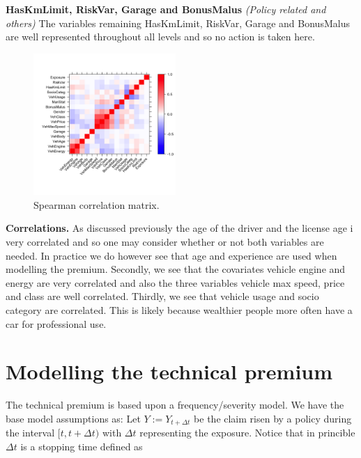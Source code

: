 \documentclass[
]{article}
\begin{document}
\textbf{HasKmLimit, RiskVar, Garage and BonusMalus} \emph{(Policy
related and others)} The variables remaining HasKmLimit, RiskVar, Garage
and BonusMalus are well represented throughout all levels and so no
action is taken here.

\begin{figure}[h]
  \begin{center}
    \includegraphics[width=0.48\textwidth]{figures/plot8.png}
  \end{center}
  \caption{Spearman correlation matrix.}
\end{figure}

\textbf{Correlations.} As discussed previously the age of the driver and
the license age i very correlated and so one may consider whether or not
both variables are needed. In practice we do however see that age and
experience are used when modelling the premium. Secondly, we see that
the covariates vehicle engine and energy are very correlated and also
the three variables vehicle max speed, price and class are well
correlated. Thirdly, we see that vehicle usage and socio category are
correlated. This is likely because wealthier people more often have a
car for professional use.

\newpage

\hypertarget{modelling-the-technical-premium}{%
\section{Modelling the technical
premium}\label{modelling-the-technical-premium}}

The technical premium is based upon a frequency/severity model. We have
the base model assumptions as: Let \(Y:=Y_{t+\Delta t}\) be the claim
risen by a policy during the interval \([t,t+\Delta t)\) with
\(\Delta t\) representing the exposure. Notice that in princible
\(\Delta t\) is a stopping time defined as
\end{document}
